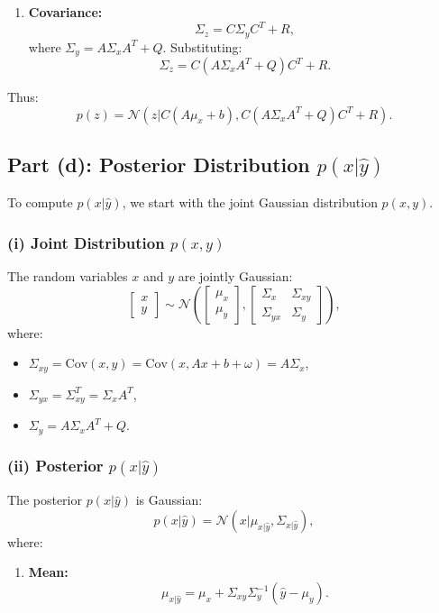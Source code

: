 \documentclass[12pt]{article}
\begin{document}
\begin{itemize}
\begin{enumerate}
    \item \textbf{Covariance:}
    \[
    \Sigma_z = C\Sigma_yC^T + R,
    \]
    where \( \Sigma_y = A\Sigma_xA^T + Q \). Substituting:
    \[
    \Sigma_z = C(A\Sigma_xA^T + Q)C^T + R.
    \]
\end{enumerate}

Thus:
\[
p(z) = \mathcal{N}(z | C(A\mu_x + b), C(A\Sigma_xA^T + Q)C^T + R).
\]

\subsection*{Part (d): Posterior Distribution \( p(x|\hat{y}) \)}
To compute \( p(x|\hat{y}) \), we start with the joint Gaussian distribution \( p(x, y) \).

\subsubsection*{(i) Joint Distribution \( p(x, y) \)}
The random variables \( x \) and \( y \) are jointly Gaussian:
\[
\begin{bmatrix}
x \\
y
\end{bmatrix}
\sim \mathcal{N}
\left(
\begin{bmatrix}
\mu_x \\
\mu_y
\end{bmatrix},
\begin{bmatrix}
\Sigma_x & \Sigma_{xy} \\
\Sigma_{yx} & \Sigma_y
\end{bmatrix}
\right),
\]
where:
\begin{itemize}
    \item \( \Sigma_{xy} = \text{Cov}(x, y) = \text{Cov}(x, Ax + b + \omega) = A\Sigma_x \),
    \item \( \Sigma_{yx} = \Sigma_{xy}^T = \Sigma_xA^T \),
    \item \( \Sigma_y = A\Sigma_xA^T + Q \).
\end{itemize}

\subsubsection*{(ii) Posterior \( p(x|\hat{y}) \)}
The posterior \( p(x|\hat{y}) \) is Gaussian:
\[
p(x|\hat{y}) = \mathcal{N}(x | \mu_{x|\hat{y}}, \Sigma_{x|\hat{y}}),
\]
where:
\begin{enumerate}
    \item \textbf{Mean:}
    \[
    \mu_{x|\hat{y}} = \mu_x + \Sigma_{xy}\Sigma_y^{-1}(\hat{y} - \mu_y).
    \]


\end{enumerate}
\end{itemize}
\end{document}
